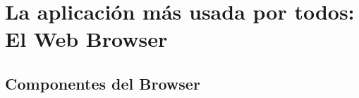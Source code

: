 \chapter{La aplicación más usada por todos: El Web Browser} %
\label{chap:chap3}










\section{Componentes del Browser}
\label{sec:chap3.1}

